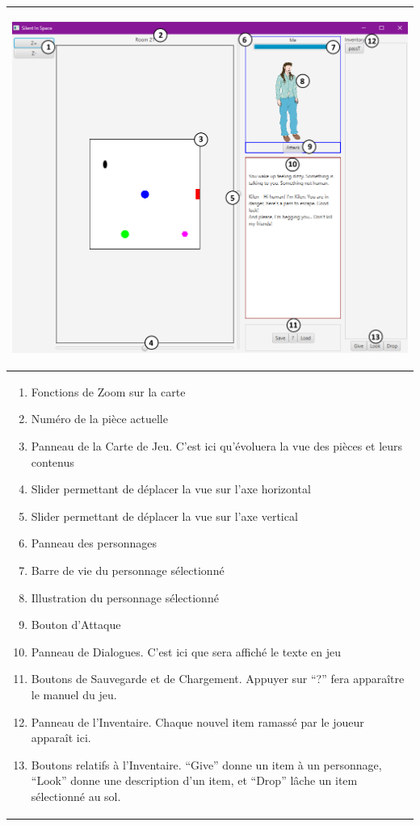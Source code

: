 \documentclass[./standalone.tex]{subfiles}
\begin{document}
\begin{tabular}{| m{40em} |}
\hline
	\begin{center}
	   \includegraphics[scale=0.4]{images/UI.png}
	\end{center}\\
\hline
	\begin{enumerate}
		\item Fonctions de Zoom sur la carte
		\item Numéro de la pièce actuelle
		\item Panneau de la Carte de Jeu. C’est ici qu’évoluera la vue des pièces et leurs contenus
		
		\item Slider permettant de déplacer la vue sur l'axe horizontal
		\item Slider permettant de déplacer la vue sur l'axe vertical
		\item Panneau des personnages
		
		\item Barre de vie du personnage sélectionné
		\item Illustration du personnage sélectionné
		\item Bouton d’Attaque
		
		\item Panneau de Dialogues. C’est ici que sera affiché le texte en jeu
		\item Boutons de Sauvegarde et de Chargement. Appuyer sur “?” fera apparaître le manuel du jeu.
		\item Panneau de l’Inventaire. Chaque nouvel item ramassé par le joueur apparaît ici.
		
		\item Boutons relatifs à l’Inventaire. “Give” donne un item à un personnage, “Look” donne une description d’un item, et “Drop” lâche un item sélectionné au sol.
	\end{enumerate}\\
\hline
\end{tabular}
\newpage
\end{document}
